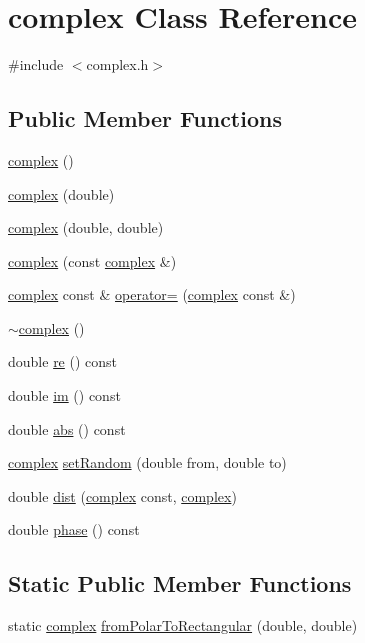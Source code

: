 \hypertarget{classcomplex}{\section{complex Class Reference}
\label{classcomplex}
}


{\ttfamily \#include $<$complex.\-h$>$}

\subsection*{Public Member Functions}
\begin{DoxyCompactItemize}
\item 
\hyperlink{classcomplex_a1fb8d3affbc54c1ad34a0820b357e194}{complex} ()
\item 
\hyperlink{classcomplex_a6ef3c27031b6d4ea7caf7c3d4dec7b17}{complex} (double)
\item 
\hyperlink{classcomplex_a745980f132ce9c232264f0aacfefb712}{complex} (double, double)
\item 
\hyperlink{classcomplex_afe655d9d3cfa7cd512e462b7947048b8}{complex} (const \hyperlink{classcomplex}{complex} \&)
\item 
\hyperlink{classcomplex}{complex} const \& \hyperlink{classcomplex_a290af8bbc9bf6dafc074211b4c91443c}{operator=} (\hyperlink{classcomplex}{complex} const \&)
\item 
\hyperlink{classcomplex_abd31d1c53fe873fa4ec0fbce50601485}{$\sim$complex} ()
\item 
double \hyperlink{classcomplex_ab789fab6f3d5ee4834938f295a493361}{re} () const 
\item 
double \hyperlink{classcomplex_a0bb3f5cbddabbbebdbbc737a1acd270e}{im} () const 
\item 
double \hyperlink{classcomplex_a124ea7e661d1bea8bd287bdd4ad73a8c}{abs} () const 
\item 
\hyperlink{classcomplex}{complex} \hyperlink{classcomplex_a393431e0e0610239fa2a5b22d708736a}{set\-Random} (double from, double to)
\item 
double \hyperlink{classcomplex_a6f8ffb4c33f81092a195af7f47314865}{dist} (\hyperlink{classcomplex}{complex} const, \hyperlink{classcomplex}{complex})
\item 
double \hyperlink{classcomplex_a540643f5a4a93afb6aea29b209eb3213}{phase} () const 
\end{DoxyCompactItemize}
\subsection*{Static Public Member Functions}
\begin{DoxyCompactItemize}
\item 
static \hyperlink{classcomplex}{complex} \hyperlink{classcomplex_a73543a2c6392ba0a6f287a8766d257bf}{from\-Polar\-To\-Rectangular} (double, double)
\end{DoxyCompactItemize}
